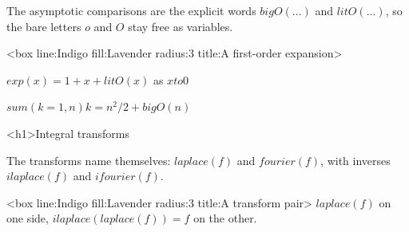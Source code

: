 \documentclass[
  margins=8,
  font=Latin Modern Roman,
  size=12,
  linespread=1.4,
  lang=en
]{scholatex}
\begin{document}
The asymptotic comparisons are the explicit words $bigO(...)$ and
$litO(...)$, so the bare letters $o$ and $O$ stay free as variables.

<box line:Indigo fill:Lavender radius:3 title:{A first-order expansion}>{
	$exp(x) = 1 + x + litO(x)$ as $x to 0$

	$sum(k=1, n) k = n^2/2 + bigO(n)$
}

<h1>Integral transforms

The transforms name themselves: $laplace(f)$ and $fourier(f)$, with inverses
$ilaplace(f)$ and $ifourier(f)$.

<box line:Indigo fill:Lavender radius:3 title:{A transform pair}>{
	$laplace(f)$ on one side, $ilaplace(laplace(f)) = f$ on the other.
}
\end{document}
